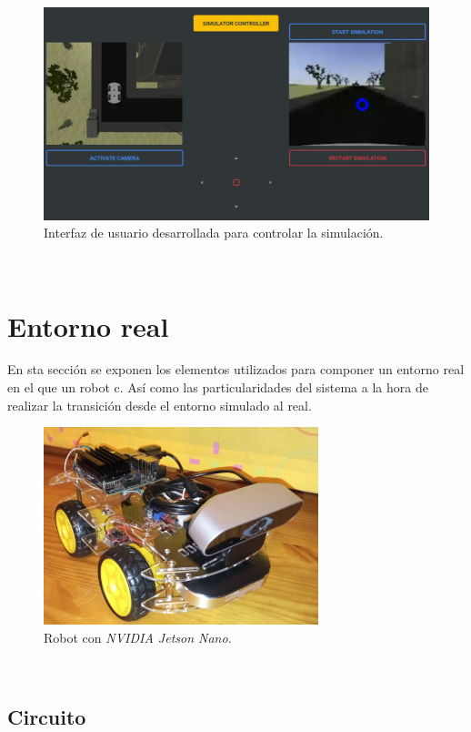 \begin{figure} [h!]
	\begin{center}
		\includegraphics[width=14cm]{figs/GUI}
	\end{center}
	\caption{Interfaz de usuario desarrollada para controlar la simulación.}
	\label{fig:gui}
\end{figure}\

\section{Entorno real}
\label{section:real}
En sta sección se exponen los elementos utilizados para componer un entorno real en el que un robot c. Así como las particularidades del sistema a la hora de realizar la transición desde el entorno simulado al real.

\begin{figure} [h!]
	\begin{center}
		\includegraphics[width=8cm]{figs/robot}
	\end{center}
	\caption{Robot con \textit{NVIDIA Jetson Nano}.}
	\label{fig:realrobot}
\end{figure}\

\subsection{Circuito}

